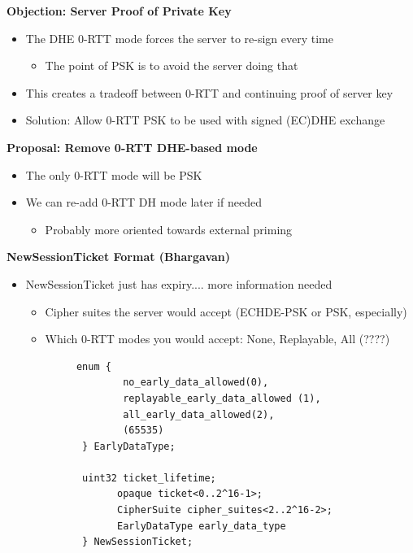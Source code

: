 \documentclass[helvetica]{seminar}
\newcommand{\heading}[1]{%
  \begin{center} 
    \large\bf 
    #1 
  \end{center} 
  \vspace{.4 in}}
\begin{document}
\begin{slide}
\heading{Objection: Server Proof of Private Key}

\begin{itemize}
\item The DHE 0-RTT mode forces the server to re-sign every time
  \begin{itemize}
  \item The point of PSK is to avoid the server doing that
  \end{itemize}

\item This creates a tradeoff between 0-RTT and continuing proof of server key
\item Solution: Allow 0-RTT PSK to be used with signed (EC)DHE exchange
\end{itemize}
\end{slide}


\begin{slide}
\heading{Proposal: Remove 0-RTT DHE-based mode}

\begin{itemize}
\item The only 0-RTT mode will be PSK
\item We can re-add 0-RTT DH mode later if needed
  \begin{itemize}
  \item Probably more oriented towards external priming
  \end{itemize}
\end{itemize}
\end{slide}


\begin{slide}
\heading{NewSessionTicket Format (Bhargavan)}

\vspace{-2ex}
\begin{itemize}
\item NewSessionTicket just has expiry.... more information needed
  \begin{itemize}
  \item Cipher suites the server would accept (ECHDE-PSK or PSK, especially)
  \item Which 0-RTT modes you would accept: None, Replayable, All (????)
  \end{itemize}
\end{itemize}

{\scriptsize
\begin{verbatim}
            enum {
                    no_early_data_allowed(0),
                    replayable_early_data_allowed (1),
                    all_early_data_allowed(2),
                    (65535)
             } EarlyDataType;
          
             uint32 ticket_lifetime;
                   opaque ticket<0..2^16-1>;
                   CipherSuite cipher_suites<2..2^16-2>;
                   EarlyDataType early_data_type
             } NewSessionTicket;
\end{verbatim}
}
\end{slide}
\end{document}
